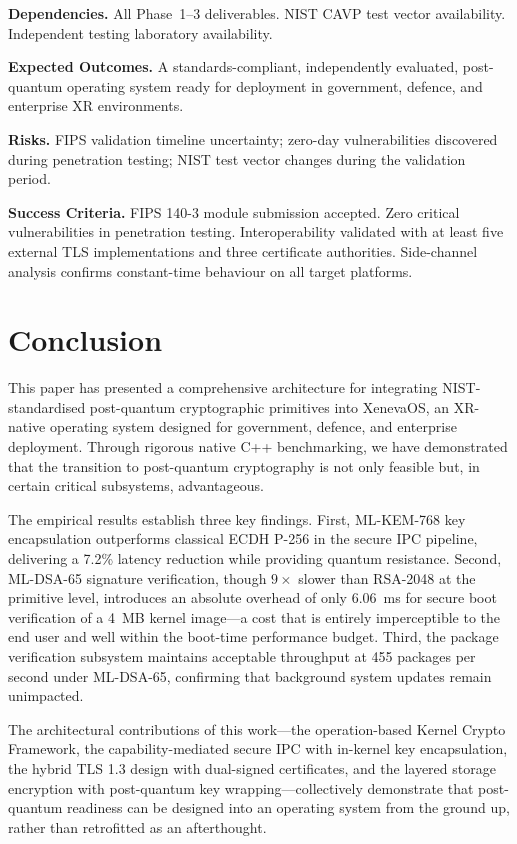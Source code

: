 \documentclass[11pt, a4paper]{article}
\begin{document}
\textbf{Dependencies.} All Phase~1--3 deliverables. NIST CAVP test vector availability. Independent testing laboratory availability.

\textbf{Expected Outcomes.} A standards-compliant, independently evaluated, post-quantum operating system ready for deployment in government, defence, and enterprise XR environments.

\textbf{Risks.} FIPS validation timeline uncertainty; zero-day vulnerabilities discovered during penetration testing; NIST test vector changes during the validation period.

\textbf{Success Criteria.} FIPS 140-3 module submission accepted. Zero critical vulnerabilities in penetration testing. Interoperability validated with at least five external TLS implementations and three certificate authorities. Side-channel analysis confirms constant-time behaviour on all target platforms.


\section{Conclusion}\label{sec:conclusion}

This paper has presented a comprehensive architecture for integrating NIST-standardised post-quantum cryptographic primitives into XenevaOS, an XR-native operating system designed for government, defence, and enterprise deployment. Through rigorous native C++ benchmarking, we have demonstrated that the transition to post-quantum cryptography is not only feasible but, in certain critical subsystems, advantageous.

The empirical results establish three key findings. First, ML-KEM-768 key encapsulation outperforms classical ECDH P-256 in the secure IPC pipeline, delivering a 7.2\% latency reduction while providing quantum resistance. Second, ML-DSA-65 signature verification, though $9\times$ slower than RSA-2048 at the primitive level, introduces an absolute overhead of only 6.06~ms for secure boot verification of a 4~MB kernel image---a cost that is entirely imperceptible to the end user and well within the boot-time performance budget. Third, the package verification subsystem maintains acceptable throughput at 455 packages per second under ML-DSA-65, confirming that background system updates remain unimpacted.

The architectural contributions of this work---the operation-based Kernel Crypto Framework, the capability-mediated secure IPC with in-kernel key encapsulation, the hybrid TLS 1.3 design with dual-signed certificates, and the layered storage encryption with post-quantum key wrapping---collectively demonstrate that post-quantum readiness can be designed into an operating system from the ground up, rather than retrofitted as an afterthought.
\end{document}
